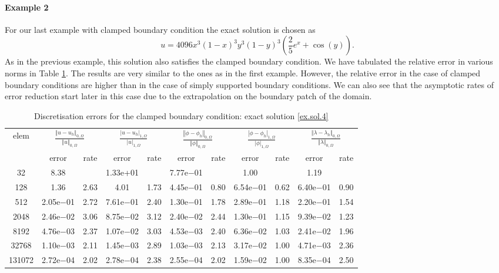 \documentclass[a4paper,final]{siamltex}
\begin{document}
\paragraph{Example 2}
For our last example with clamped boundary condition the exact solution is 
chosen as 
\begin{equation}\label{ex.sol.4}
u = 4096x^3(1-x)^3y^3(1-y)^3\left(\frac{2}{5}e^x + \cos(y)\right).
\end{equation}
As in the previous example, this solution also satisfies the clamped boundary condition. 
We have tabulated the relative error in various norms in Table \ref{clbc2}. 
The results are very similar to the ones as in the first example. However, the relative error in the case of 
clamped boundary conditions are higher than in the case of simply supported boundary conditions. 
We can also see that the asymptotic rates of error reduction start later in this case 
due to the extrapolation on the boundary patch of the domain. 
\begin{table}[htb!]
	\centering
	\caption{Discretisation errors  for the clamped boundary condition: exact solution \eqref{ex.sol.4}}
	\begin{tabular}{|c|cc|cc|cc|cc|cc|}
		\hline
			\multirow{2}{*}{elem} & \multicolumn{2}{c|}{$\frac{\left\Vert u - u_h\right\Vert_{0,\Omega}}{\left\Vert u\right\Vert_{0,\Omega}}$} & \multicolumn{2}{c|}{$\frac{| u - u_h|_{1,\Omega}}{|u|_{1,\Omega}}$} & \multicolumn{2}{c|}{$\frac{\left\Vert \phi - \phi_h\right\Vert_{0,\Omega}}{\left\Vert \phi\right\Vert_{0,\Omega}}$} & \multicolumn{2}{c|}{$\frac{|\phi - \phi_h|_{1,\Omega}}{| \phi|_{1,\Omega}}$} & \multicolumn{2}{c|}{$\frac{\left\Vert \lambda - \lambda_h\right\Vert_{0,\Omega}}{\left\Vert \lambda\right\Vert_{0,\Omega}}$}\\ \hhline{~----------}
		& error & rate & error & rate & error & rate & error & rate & error & rate \\\hline
 32 & 8.38 &   & 1.33e+01 &   & 7.77e$-$01 &          & 1.00 &          & 1.19 &          \\\hline
  128 & 1.36 & 2.63 & 4.01 & 1.73 & 4.45e$-$01 & 0.80 & 6.54e$-$01 & 0.62 & 6.40e$-$01 & 0.90 \\\hline
  512 & 2.05e$-$01 & 2.72 & 7.61e$-$01 & 2.40 & 1.30e$-$01 & 1.78 & 2.89e$-$01 & 1.18 & 2.20e$-$01 & 1.54 \\\hline
 2048 & 2.46e$-$02 & 3.06 & 8.75e$-$02 & 3.12 & 2.40e$-$02 & 2.44 & 1.30e$-$01 & 1.15 & 9.39e$-$02 & 1.23 \\\hline
 8192 & 4.76e$-$03 & 2.37 & 1.07e$-$02 & 3.03 & 4.53e$-$03 & 2.40 & 6.36e$-$02 & 1.03 & 2.41e$-$02 & 1.96 \\\hline
32768 & 1.10e$-$03 & 2.11 & 1.45e$-$03 & 2.89 & 1.03e$-$03 & 2.13 & 3.17e$-$02 & 1.00 & 4.71e$-$03 & 2.36 \\\hline
131072 & 2.72e$-$04 & 2.02 & 2.78e$-$04 & 2.38 & 2.55e$-$04 & 2.02 & 1.59e$-$02 & 1.00 & 8.35e$-$04 & 2.50 \\\hline
	\end{tabular}
	\label{clbc2}
\end{table}
\end{document}
